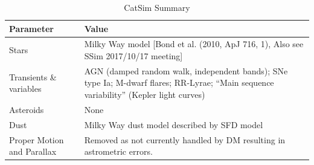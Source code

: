 \documentclass[preprint,times]{aastex61}
\begin{document}
\begin{table}[!htb]
  \centering
  \caption{CatSim Summary}
  \label{tab:catsim-options}
  \begin{tabular}{| L{0.2\textwidth}| L{0.75\textwidth}| }
    \hline 
    Parameter                       & Value   \\
    \hline
    Stars                               & Milky Way model [Bond et al. (2010, ApJ 716, 1), Also see SSim 2017/10/17 meeting]\\
    Transients \& variables  & AGN (damped random walk, independent bands); SNe type Ia; M-dwarf flares; RR-Lyrae; ``Main sequence variability'' (Kepler light curves) \\
    Asteroids                       & None \\
    Dust                               & Milky Way dust model described by SFD model \\
    Proper Motion and Parallax & Removed as not currently handled by DM resulting in astrometric errors. \\
    \hline
  \end{tabular}
\end{table}
\end{document}
